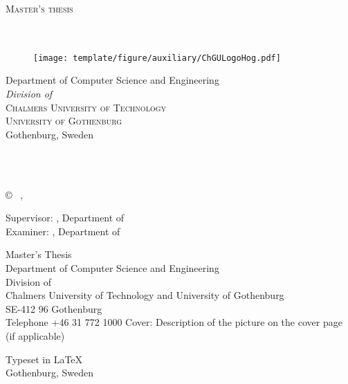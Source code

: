 \newpage
\thispagestyle{empty}
\begin{center}
	\textsc{\large Master's thesis \the\year}\\[4cm]		%
	\textbf{\Large \multiLineTitle{0.2cm}} \\[1cm]
	{\large \oneLineSubtitle}\\[1cm]
	{\large \@author}

	\vfill
	\begin{figure}[H]
	\centering
	\texttt{[image: template/figure/auxiliary/ChGULogoHog.pdf]}
	\end{figure}	\vspace{5mm}

	Department of Computer Science and Engineering\\
	\emph{Division of \@division}\\
	\textsc{Chalmers University of Technology} \\
	\textsc{University of Gothenburg} \\
	Gothenburg, Sweden \the\year \\
\end{center}


\newpage
\thispagestyle{plain}
\vspace*{4.5cm}
\noindent \oneLineTitle\\
\oneLineSubtitle\\
\@author

\vspace{1cm}

\copyright ~ \@author, \the\year

\vspace{1em}

Supervisor: \@supervisor, Department of \@departmentofsupervisor\\
Examiner: \@examiner, Department of \@departmentofexaminer

\vspace{1em}

Master's Thesis \the\year\\
Department of Computer Science and Engineering\\
Division of \@division\\
Chalmers University of Technology and University of Gothenburg\\
SE-412 96 Gothenburg\\
Telephone +46 31 772 1000
\vspace{0.5cm}
\vfill
Cover: Description of the picture on the cover page (if applicable)

Typeset in \LaTeX \\
Gothenburg, Sweden \the\year

\setlength{\parindent}{1.5em}
\makeatother
